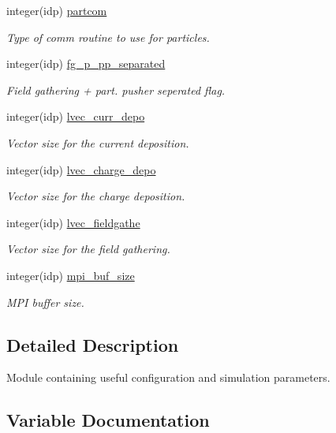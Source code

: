\begin{DoxyCompactItemize}
integer(idp) \hyperlink{namespaceparams_aa63204e737d29465924b4275b46ddfb3}{partcom}
\begin{DoxyCompactList}\small\item\em Type of comm routine to use for particles. \end{DoxyCompactList}\item 
integer(idp) \hyperlink{namespaceparams_a041d5cfcf8653c0bd7eacd2e48077d42}{fg\+\_\+p\+\_\+pp\+\_\+separated}
\begin{DoxyCompactList}\small\item\em Field gathering + part. pusher seperated flag. \end{DoxyCompactList}\item 
integer(idp) \hyperlink{namespaceparams_aedb04c2dd01619937eaad2ce0a2626a5}{lvec\+\_\+curr\+\_\+depo}
\begin{DoxyCompactList}\small\item\em Vector size for the current deposition. \end{DoxyCompactList}\item 
integer(idp) \hyperlink{namespaceparams_a73dceeb78f9f0abe2d39ba48e2aee2d9}{lvec\+\_\+charge\+\_\+depo}
\begin{DoxyCompactList}\small\item\em Vector size for the charge deposition. \end{DoxyCompactList}\item 
integer(idp) \hyperlink{namespaceparams_acb2db26088c715aabd2ca6722e0bcdc6}{lvec\+\_\+fieldgathe}
\begin{DoxyCompactList}\small\item\em Vector size for the field gathering. \end{DoxyCompactList}\item 
integer(idp) \hyperlink{namespaceparams_a130afa667477bbefb53f06c15b86d2e1}{mpi\+\_\+buf\+\_\+size}
\begin{DoxyCompactList}\small\item\em M\+PI buffer size. \end{DoxyCompactList}\end{DoxyCompactItemize}


\subsection{Detailed Description}
Module containing useful configuration and simulation parameters. 

\subsection{Variable Documentation}
